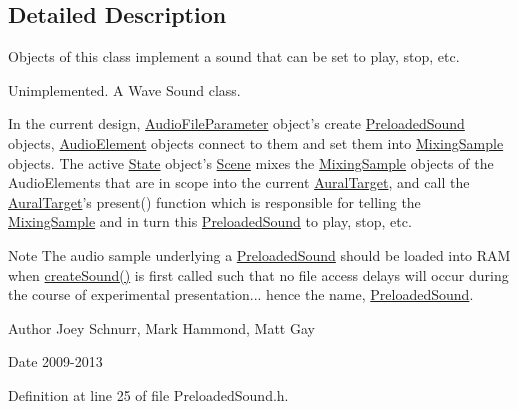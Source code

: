 \subsection{Detailed Description}
Objects of this class implement a sound that can be set to play, stop, etc. 

Unimplemented. A Wave Sound class.

In the current design, \hyperlink{class_picto_1_1_audio_file_parameter}{Audio\-File\-Parameter} object's create \hyperlink{class_picto_1_1_preloaded_sound}{Preloaded\-Sound} objects, \hyperlink{class_picto_1_1_audio_element}{Audio\-Element} objects connect to them and set them into \hyperlink{class_picto_1_1_mixing_sample}{Mixing\-Sample} objects. The active \hyperlink{class_picto_1_1_state}{State} object's \hyperlink{class_picto_1_1_scene}{Scene} mixes the \hyperlink{class_picto_1_1_mixing_sample}{Mixing\-Sample} objects of the Audio\-Elements that are in scope into the current \hyperlink{class_picto_1_1_aural_target}{Aural\-Target}, and call the \hyperlink{class_picto_1_1_aural_target}{Aural\-Target}'s present() function which is responsible for telling the \hyperlink{class_picto_1_1_mixing_sample}{Mixing\-Sample} and in turn this \hyperlink{class_picto_1_1_preloaded_sound}{Preloaded\-Sound} to play, stop, etc. \begin{DoxyNote}{Note}
The audio sample underlying a \hyperlink{class_picto_1_1_preloaded_sound}{Preloaded\-Sound} should be loaded into R\-A\-M when \hyperlink{class_picto_1_1_preloaded_sound_ae242a5728bce44d1ac6bfcac2b958f81}{create\-Sound()} is first called such that no file access delays will occur during the course of experimental presentation... hence the name, \hyperlink{class_picto_1_1_preloaded_sound}{Preloaded\-Sound}. 
\end{DoxyNote}
\begin{DoxyAuthor}{Author}
Joey Schnurr, Mark Hammond, Matt Gay 
\end{DoxyAuthor}
\begin{DoxyDate}{Date}
2009-\/2013 
\end{DoxyDate}


Definition at line 25 of file Preloaded\-Sound.\-h.



